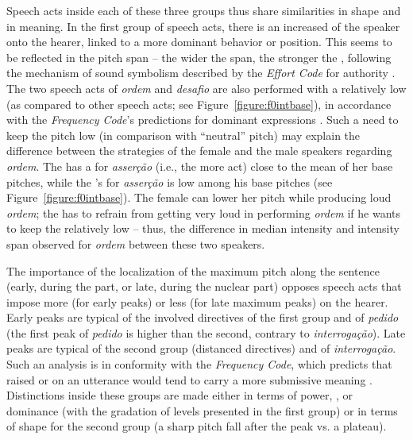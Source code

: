 \documentclass[output=paper]{LSP/langsci}
\begin{document}
Speech acts inside each of these three groups thus share similarities in shape and in meaning. 
In the first group of speech acts, there is an increased  of the speaker onto the hearer, linked to a more dominant behavior or position. 
This seems to be reflected in the pitch span -- the wider the span, the stronger the , following the mechanism of sound symbolism described by the \textit{Effort Code} for authority \citep{Gussenhoven2004}. 
The two speech acts of \textit{ordem} and \textit{desafio} are also performed with a relatively low  (as compared to other speech acts; see Figure~\ref{figure:f0intbase}), in accordance with the \textit{Frequency Code}'s predictions for dominant expressions \citep{ohala1994symbolism}. 
Such a need to keep the pitch low (in comparison with ``neutral'' pitch) may explain the difference between the strategies of the female and the male speakers regarding \textit{ordem}. 
The  has a  for \textit{asserção} (i.e., the more  act) close to the mean of her base pitches, while the 's  for \textit{asserção} is low among his base pitches (see Figure~\ref{figure:f0intbase}). 
The female can lower her pitch while producing loud \textit{ordem}; the  has to refrain from getting very loud in performing \textit{ordem} if he wants to keep the  relatively low -- thus, the difference in median intensity and intensity span observed for \textit{ordem} between these two speakers.

The importance of the localization of the maximum pitch along the sentence (early, during the  part, or late, during the nuclear part) opposes speech acts that impose more (for early peaks) or less (for late maximum peaks) on the hearer. 
Early peaks are typical of the involved directives of the first group and of \textit{pedido} (the first peak of \textit{pedido} is higher than the second, contrary to \textit{interrogação}). 
Late peaks are typical of the second group (distanced directives) and of \textit{interrogação}. 
Such an analysis is in conformity with the \textit{Frequency Code}, which predicts that raised or  on an utterance would tend to carry a more submissive meaning \citep{ohala1994symbolism}. 
Distinctions inside these groups are made either in terms of power, , or dominance (with the gradation of  levels presented in the first group) or in terms of shape for the second group (a sharp pitch fall after the peak vs. a plateau).
\end{document}
